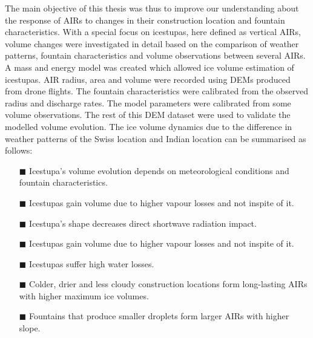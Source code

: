 The main objective of this thesis was thus to improve our understanding about the response of AIRs to changes in
their construction location and fountain characteristics. With a special focus on icestupas, here defined as
vertical AIRs, volume changes were investigated in detail based on the comparison of weather patterns, fountain
characteristics and volume observations between several AIRs. A mass and energy model was created which allowed
ice volume estimation of icestupas. AIR radius, area and volume were recorded using DEMs produced from drone
flights. The fountain characteristics were calibrated from the observed radius and discharge rates. The model
parameters were calibrated from some volume observations. The rest of this DEM dataset were used to validate the
modelled volume evolution. The ice volume dynamics due to the difference in weather patterns of the Swiss
location and Indian location can be summarised as follows: 


%  
%  

\begin{itemize} 

\item[\tiny{$\blacksquare$}] Icestupa's volume evolution depends on meteorological conditions and fountain
  characteristics.

\item[\tiny{$\blacksquare$}] Icestupas gain volume due to higher vapour losses and not inspite of it. 

\item[\tiny{$\blacksquare$}] Icestupa's shape decreases direct shortwave radiation impact.

\item[\tiny{$\blacksquare$}] Icestupas gain volume due to higher vapour losses and not inspite of it. 

\item[\tiny{$\blacksquare$}] Icestupas suffer high water losses.
 
\end{itemize}

\begin{itemize} 

\item[\tiny{$\blacksquare$}] Colder, drier and less cloudy construction locations form long-lasting AIRs with
  higher maximum ice volumes. 

\item[\tiny{$\blacksquare$}] Fountains that produce smaller droplets form larger AIRs with higher slope. 

\end{itemize}


